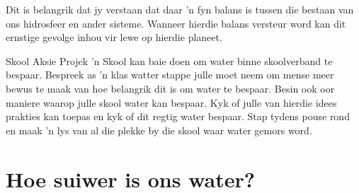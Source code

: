       \label{m38138*id342412}Dit is belangrik dat jy verstaan dat daar   'n fyn balans is tussen die bestaan van ons hidrosfeer en ander sisteme. Wanneer hierdie balans versteur word kan dit ernstige gevolge inhou vir lewe op hierdie planeet.
\label{m38138*secfhsst!!!underscore!!!id1065}
            \begin{project}{Skool Aksie Projek
      }
            \nopagebreak
  'n Skool kan baie doen om water binne skoolverband te bespaar. Bespreek as   'n klas watter stappe julle moet neem om mense meer bewus te maak van hoe belangrik dit is om water te bespaar. Besin ook oor maniere waarop julle skool water kan bespaar. Kyk of julle van hierdie idees prakties kan toepas en kyk of dit regtig water bespaar. Stap tydens pouse rond en maak   'n lys van al die plekke by die skool waar water gemors word.
\end{project}

\section{Hoe suiwer is ons water?}
            \nopagebreak

